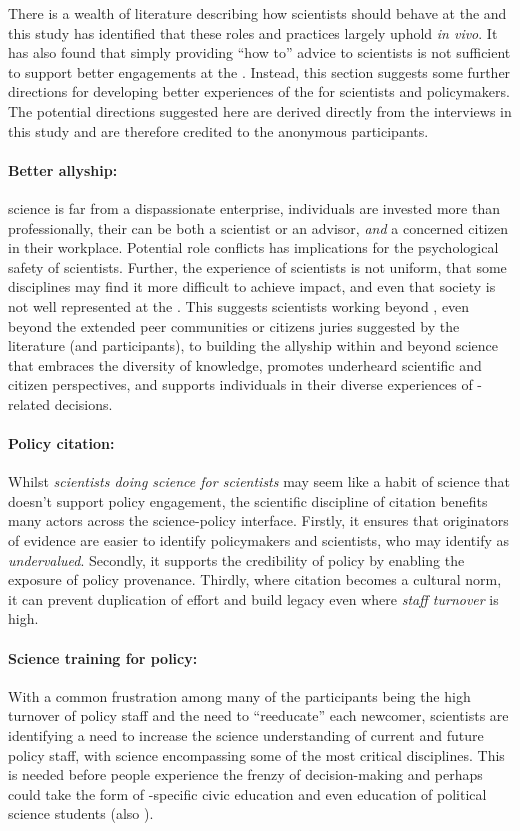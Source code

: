 There is a wealth of literature describing how scientists should behave at the \SPI{} and this study has identified that these roles and practices largely uphold \emph{in vivo}. It has also found that simply providing ``how to'' advice to scientists is not sufficient to support better engagements at the \SPI. Instead, this section suggests some further directions for developing better experiences of the \SPI{} for scientists and policymakers. The potential directions suggested here are derived directly from the interviews in this study and are therefore credited to the anonymous participants.

\paragraph{Better allyship:}
\CAN{} science is far from a dispassionate enterprise, individuals are invested more than professionally, their \skirole{} can be both a scientist or an advisor, \emph{and} a concerned citizen in their workplace. Potential role conflicts has implications for the psychological safety of scientists. Further, the experience of scientists is not uniform, that some disciplines may find it more difficult to achieve impact, and even that society is not well represented at the \SPI{}. This suggests scientists working beyond \skinetw{}, even beyond the extended peer communities or citizens juries suggested by the literature (and participants), to building the allyship within and beyond science that embraces the diversity of knowledge, promotes underheard scientific and citizen perspectives, and supports individuals in their diverse experiences of \CAN-related decisions.

\paragraph{Policy citation:}
Whilst \emph{scientists doing science for scientists} may seem like a habit of science \skiinst{} that doesn't support policy engagement, the scientific discipline of citation benefits many actors across the science-policy interface. Firstly, it ensures that originators of evidence are easier to identify policymakers and scientists, who may identify as \emph{undervalued}. Secondly, it supports the credibility of policy by enabling the exposure of policy provenance. Thirdly, where citation becomes a cultural norm, it can prevent duplication of effort and build legacy even where \emph{staff turnover} is high.

\paragraph{Science training for policy:}
With a common frustration among many of the participants being the high turnover of policy staff and the need to ``reeducate'' each newcomer, scientists are identifying a need to increase the science understanding of current and future policy staff, with \CAN{} science encompassing some of the most critical disciplines. This is needed before people experience the frenzy of decision-making and perhaps could take the form of \CAN-specific civic education and even education of political science students (also \cite{DykeM2024}).

